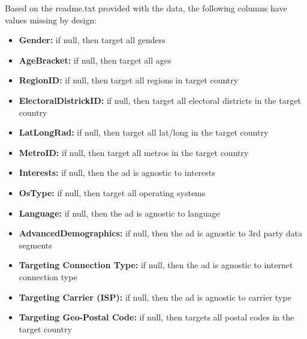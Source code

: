 \documentclass[11pt]{article}
\providecommand{\tightlist}{%
      \setlength{\itemsep}{0pt}\setlength{\parskip}{0pt}}
\begin{document}
    Based on the readme.txt provided with the data, the following columns
have values missing by design:

\begin{itemize}
\tightlist
\item
  \textbf{Gender:} if null, then target all genders
\item
  \textbf{AgeBracket:} if null, then target all ages
\item
  \textbf{RegionID:} if null, then target all regions in target country
\item
  \textbf{ElectoralDistrickID:} if null, then target all electoral
  districts in the target country
\item
  \textbf{LatLongRad:} if null, then target all lat/long in the target
  country
\item
  \textbf{MetroID:} if null, then target all metros in the target
  country
\item
  \textbf{Interests:} if null, then the ad is agnostic to interests
\item
  \textbf{OsType:} if null, then target all operating systems
\item
  \textbf{Language:} if null, then the ad is agnostic to language
\item
  \textbf{AdvancedDemographics:} if null, then the ad is agnostic to 3rd
  party data segments
\item
  \textbf{Targeting Connection Type:} if null, then the ad is agnostic
  to internet connection type
\item
  \textbf{Targeting Carrier (ISP):} if null, then the ad is agnostic to
  carrier type
\item
  \textbf{Targeting Geo-Postal Code:} if null, then targets all postal
  codes in the target country
\end{itemize}
\end{document}
